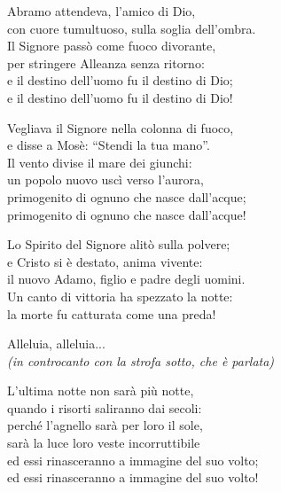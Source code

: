 Abramo attendeva, l'amico di Dio,\\
con cuore tumultuoso, sulla soglia dell'ombra.\\
Il Signore passò come fuoco divorante,\\
per stringere Alleanza senza ritorno:\\
e il destino dell'uomo fu il destino di Dio;\\
e il destino dell'uomo fu il destino di Dio!

\spazio


\spazio

Vegliava il Signore nella colonna di fuoco,\\
e disse a Mosè: ``Stendi la tua mano''.\\
Il vento divise il mare dei giunchi:\\
un popolo nuovo uscì verso l'aurora,\\
primogenito di ognuno che nasce dall'acque;\\
primogenito di ognuno che nasce dall'acque!

\spazio


\spazio

Lo Spirito del Signore alitò sulla polvere;\\
e Cristo si è destato, anima vivente:\\
il nuovo Adamo, figlio e padre degli uomini.\\
Un canto di vittoria ha spezzato la notte:\\	
la morte fu catturata come una preda!

\spazio

 

\spazio

Alleluia, alleluia...\\
\emph{(in controcanto con la strofa sotto, che è parlata)}

\spazio

L'ultima notte non sarà più notte,\\
quando i risorti saliranno dai secoli:\\
perché l'agnello sarà per loro il sole,\\
sarà la luce loro veste incorruttibile\\
ed essi rinasceranno a immagine del suo volto;\\
ed essi rinasceranno a immagine del suo volto!

\spazio

